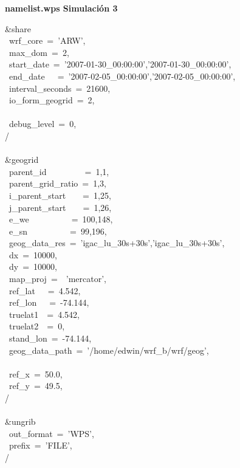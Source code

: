 



\textbf{namelist.wps Simulación 3}

\&share\\
~wrf\_core~=~'ARW',\\
~max\_dom~=~2,\\
~start\_date~=~'2007-01-30\_00:00:00','2007-01-30\_00:00:00',\\
~end\_date~~~=~'2007-02-05\_00:00:00','2007-02-05\_00:00:00',\\
~interval\_seconds~=~21600,\\
~io\_form\_geogrid~=~2,\\
\\
~debug\_level~=~0,\\
/\\
\\
\&geogrid\\
~parent\_id~~~~~~~~~=~1,1,\\
~parent\_grid\_ratio~=~1,3,\\
~i\_parent\_start~~~~=~1,25,\\
~j\_parent\_start~~~~=~1,26,\\
~e\_we~~~~~~~~~~=~100,148,\\
~e\_sn~~~~~~~~~~=~99,196,\\
~geog\_data\_res~=~'igac\_lu\_30s+30s','igac\_lu\_30s+30s',\\
~dx~=~10000,\\
~dy~=~10000,\\
~map\_proj~=~~'mercator',\\
~ref\_lat~~~=~4.542,\\
~ref\_lon~~~=~-74.144,\\
~truelat1~~=~4.542,\\
~truelat2~~=~0,\\
~stand\_lon~=~-74.144,\\
~geog\_data\_path~=~'/home/edwin/wrf\_b/wrf/geog',\\
\\
~ref\_x~=~50.0,\\
~ref\_y~=~49.5,\\
/\\
\\
\&ungrib\\
~out\_format~=~'WPS',\\
~prefix~=~'FILE',\\
/\\
\\
